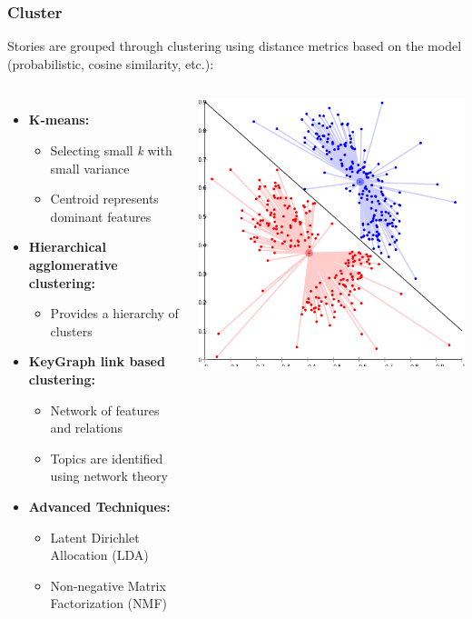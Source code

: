 \documentclass{beamer}
\begin{document}
\begin{frame}
	\frametitle{Cluster}
	Stories are grouped through clustering using distance metrics based on the
	model (probabilistic, cosine similarity, etc.):
	\begin{columns}[c]
		\column{3in}
		\begin{itemize}
			\item {\bf K-means:}
				\begin{itemize}
					\item Selecting small \emph{k} with small variance
					\item Centroid represents dominant features
				\end{itemize}
			\item {\bf Hierarchical agglomerative clustering:}
				\begin{itemize}
					\item Provides a hierarchy of clusters 
				\end{itemize}
			\item {\bf KeyGraph link based clustering:}
				\begin{itemize}
					\item Network of features and relations
					\item Topics are identified using network theory
				\end{itemize}
			\item {\bf Advanced Techniques:}
				\begin{itemize}
					\item Latent Dirichlet Allocation (LDA)
					\item Non-negative Matrix Factorization (NMF) \citep{sayyadi2009event}
				\end{itemize}
		\end{itemize}
		\column{1in}
			\includegraphics[width=\textwidth]{images/cluster_centroid.png} \\

\end{columns}
\end{frame}
\end{document}
